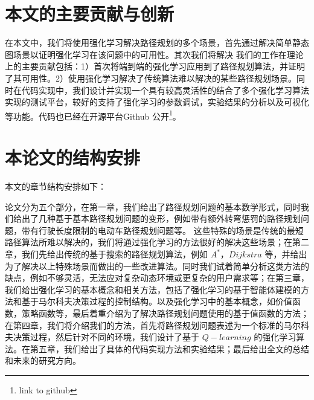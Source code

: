 \documentclass{standalone}
\begin{document}


\section{本文的主要贡献与创新} 
在本文中，我们将使用强化学习解决路径规划的多个场景，首先通过解决简单静态图场景以证明强化学习在该问题中的可用性。其次我们将解决
我们的工作在理论上的主要贡献包括：1）首次将端到端的强化学习应用到了路径规划算法，并证明了其可用性。2）使用强化学习解决了传统算法难以解决的某些路径规划场景。同时在代码实现中，我们设计并实现一个具有较高灵活性的结合了多个强化学习算法实现的测试平台，较好的支持了强化学习的参数调试，实验结果的分析以及可视化等功能。代码也已经在开源平台Github 公开\footnote{link to github}。

\section{本论文的结构安排}
本文的章节结构安排如下：\par
论文分为五个部分，在第一章，我们给出了路径规划问题的基本数学形式，同时我们给出了几种基于基本路径规划问题的变形，例如带有额外转弯惩罚的路径规划问题，带有行驶长度限制的电动车路径规划问题等。
这些特殊的场景是传统的最短路径算法所难以解决的，我们将通过强化学习的方法很好的解决这些场景；在第二章，我们先给出传统的基于搜索的路径规划算法，例如 $A^{*}$，$Dijkstra$ 等，并给出为了解决以上特殊场景而做出的一些改进算法。同时我们试着简单分析这类方法的缺点，例如不够灵活，无法应对复杂动态环境或更复杂的用户需求等；在第三章，我们给出强化学习的基本概念和相关方法，包括了强化学习的基于智能体建模的方法和基于马尔科夫决策过程的控制结构。以及强化学习中的基本概念，如价值函数，策略函数等，最后着重介绍为了解决路径规划问题使用的基于值函数的方法；在第四章，我们将介绍我们的方法，首先将路径规划问题表述为一个标准的马尔科夫决策过程，然后针对不同的环境，我们设计了基于 $Q-learning$ 的强化学习算法。在第五章，我们给出了具体的代码实现方法和实验结果；最后给出全文的总结和未来的研究方向。
\end{document}
